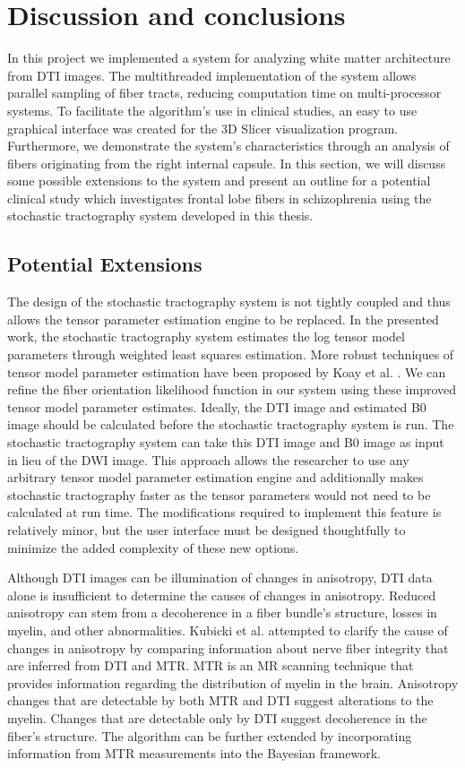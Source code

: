 \chapter{Discussion and conclusions}
In this project we implemented a system for analyzing white matter architecture from DTI images.  The multithreaded implementation of the system allows parallel sampling of fiber tracts, reducing computation time on multi-processor systems.  To facilitate the algorithm's use in clinical studies, an easy to use graphical interface was created for the 3D Slicer visualization program. Furthermore, we demonstrate the system's characteristics through an analysis of fibers originating from the right internal capsule.  In this section, we will discuss some possible extensions to the system and present an outline for a potential clinical study which investigates frontal lobe fibers in schizophrenia using the stochastic tractography system developed in this thesis.

\section{Potential Extensions}
The design of the stochastic tractography system is not tightly coupled and thus allows the tensor parameter estimation engine to be replaced.  In the presented work, the stochastic tractography system estimates the log tensor model parameters through weighted least squares estimation.  More robust techniques of tensor model parameter estimation have been proposed by Koay et al. \cite{koay06}.  We can refine the fiber orientation likelihood function in our system using these improved tensor model parameter estimates.  Ideally, the DTI image and estimated B0 image should be calculated before the stochastic tractography system is run.  The stochastic tractography system can take this DTI image and B0 image as input in lieu of the DWI image.  This approach allows the researcher to use any arbitrary tensor model parameter estimation engine and additionally makes stochastic tractography faster as the tensor parameters would not need to be calculated at run time.  The modifications required to implement this feature is relatively minor, but the user interface must be designed thoughtfully to minimize the added complexity of these new options.

Although DTI images can be illumination of changes in anisotropy, DTI data alone is insufficient to determine the causes of changes in anisotropy.  Reduced anisotropy can stem from a decoherence in a fiber bundle's structure, losses in myelin, and other abnormalities.  Kubicki et al. \cite{kubickiNI05} attempted to clarify the cause of changes in anisotropy by comparing information about nerve fiber integrity that are inferred from DTI and MTR.  MTR is an MR scanning technique that provides information regarding the distribution of myelin in the brain. Anisotropy changes that are detectable by both MTR and DTI suggest alterations to the myelin.  Changes that are detectable only by DTI suggest decoherence in the fiber's structure.  The algorithm can be further extended by incorporating information from MTR measurements \cite{kubickiNI05} into the Bayesian framework.

